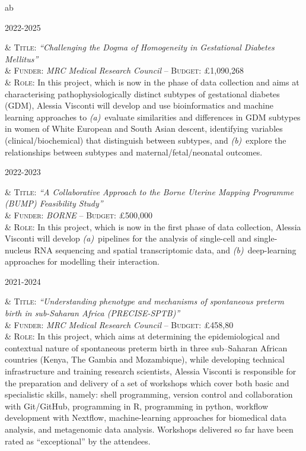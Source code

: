 \documentclass[a4paper,10pt]{article}
\newenvironment{singletablelist}
{	\vspace{-0.2cm}
	\begin{longtable}[!h]{ab}}{\end{longtable}
}
\newcommand{\stlist}[2]{
	\hspace{-3cm}
	\noindent
	\begin{minipage}{0.24\textwidth}
	\begin{flushright}
	\textsc{#1}
	\end{flushright}
	\end{minipage}
	& #2\\[0.2cm]
}
\begin{document}
\begin{singletablelist}
	
    \stlist{2022-2025}{ 
		  \textsc{Title:} \emph{``Challenging the Dogma of Homogeneity in Gestational Diabetes Mellitus''}\\
		& \textsc{Funder:} \emph{MRC Medical Research Council} -- \textsc{Budget:} £1,090,268  \\
		& \textsc{Role:} In this project, which is now in the phase of data collection and aims at characterising pathophysiologically distinct subtypes of gestational diabetes (GDM), Alessia Visconti will develop and use bioinformatics and machine learning approaches to \emph{(a)}~evaluate similarities and differences in GDM subtypes in women of White European and South Asian descent, identifying variables (clinical/biochemical) that distinguish between subtypes, and \emph{(b)}~explore the relationships between subtypes and maternal/fetal/neonatal outcomes.
		}
	 
	\stlist{2022-2023}{
		  \textsc{Title:} \emph{``A Collaborative Approach to the Borne Uterine Mapping Programme (BUMP) Feasibility Study''}\\
		& \textsc{Funder:} \emph{BORNE} -- \textsc{Budget:} £500,000 \\
		& \textsc{Role:} In this project, which is now in the first phase of data collection, Alessia Visconti will develop \emph{(a)}~pipelines for the analysis of single-cell and single-nucleus RNA sequencing and spatial transcriptomic data, and \emph{(b)}~deep-learning approaches for modelling their interaction.
	} 

	\stlist{2021-2024}{ 
		  \textsc{Title:} \emph{``Understanding phenotype and mechanisms of spontaneous preterm birth in sub-Saharan Africa (PRECISE-SPTB)''}\\
		& \textsc{Funder:} \emph{MRC Medical Research Council} -- \textsc{Budget:} £458,80 \\
		& \textsc{Role:} In this project, which aims at determining the epidemiological and contextual nature of spontaneous preterm birth in three sub–Saharan African countries (Kenya, The Gambia and Mozambique), while developing technical infrastructure and training research scientists, Alessia Visconti is responsible for the preparation and delivery of a set of workshops which cover both basic and specialistic skills, namely: shell programming, version control and collaboration with Git/GitHub, programming in R, programming in python, workflow development with Nextflow, machine-learning approaches for biomedical data analysis, and metagenomic data analysis. Workshops delivered so far have been rated as “exceptional” by the attendees.
		}
		

\end{singletablelist}
\end{document}
